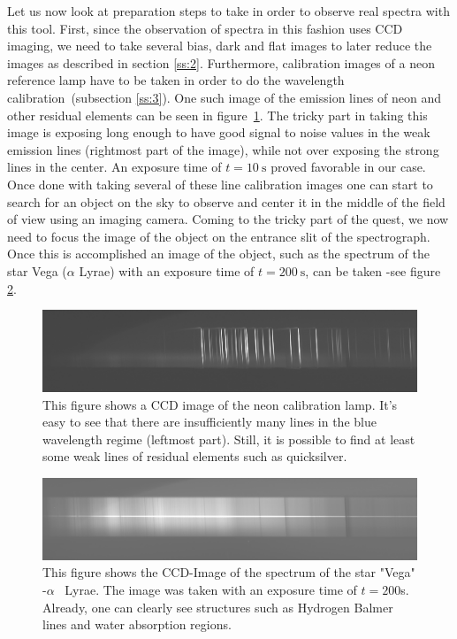 \documentclass{article}
\begin{document}
Let us now look at preparation steps to take in order to observe real spectra with this tool. First, since the observation of spectra in this fashion uses CCD imaging, we need to take several bias, dark and flat images to later reduce the images as described in section \ref{ss:2}. Furthermore, calibration images of a neon reference lamp have to be taken in order to do the wavelength calibration~(subsection \ref{ss:3}). One such image of the emission lines of neon and other residual elements can be seen in figure~\ref{fig:2}. The tricky part in taking this image is exposing long enough to have good signal to noise values in the weak emission lines (rightmost part of the image), while not over exposing the strong lines in the center. An exposure time of $t=\SI{10}{\second}$ proved favorable in our case. Once done with taking several of these line calibration images one can start to search for an object on the sky to observe and center it in the middle of the field of view using an imaging camera. Coming to the tricky part of the quest, we now need to focus the image of the object on the entrance slit of the spectrograph. Once this is accomplished an image of the object, such as the spectrum of the star Vega ($\alpha$ Lyrae) with an exposure time of $t=\SI{200}{\second}$, can be taken {-}see figure \ref{fig:3}. 

\begin{figure}[H]
  	\centering
	\includegraphics[width=1.00\textwidth]{spectroscopy/calibration_ccd_image.jpg}
  	\caption{This figure shows a CCD image of the neon calibration lamp. It's easy to see that there are insufficiently many lines in the blue wavelength regime (leftmost part). Still, it is possible to find at least some weak lines of residual elements such as quicksilver.}
  	\label{fig:2}
\end{figure}

\begin{figure}[H]
  	\centering
    \includegraphics[width=1.00\textwidth]{spectroscopy/spectrum_ccd_image.jpg}
  	\caption{This figure shows the CCD-Image of the spectrum of the star "Vega" {-}$\alpha$ ~Lyrae. The image was taken with an exposure time of $t=200$s. Already, one can clearly see structures such as Hydrogen Balmer lines and water absorption regions.}
  	\label{fig:3}
\end{figure}
\end{document}
